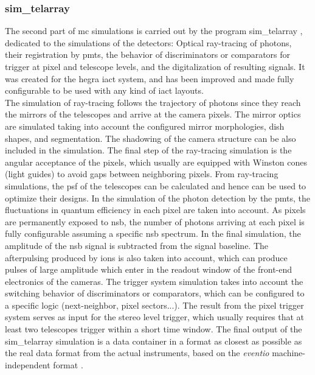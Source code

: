 \documentclass[main.tex]{subfiles}
\begin{document}
\subsubsection{sim\_telarray} \label{sec:simtel}

The second part of \gls{mc} simulations is carried out by the program sim\_telarray \cite{2008corsikanadsimtelarray}, dedicated to the simulations of the detectors: Optical ray-tracing of photons, their registration by \glspl{pmt}, the behavior of discriminators or comparators for trigger at pixel and telescope levels, and the digitalization of resulting signals. It was created for the \gls{hegra} \gls{iact} system, and has been improved and made fully configurable to be used with any kind of \gls{iact} layouts.\\
The simulation of ray-tracing follows the trajectory of photons since they reach the mirrors of the telescopes and arrive at the camera pixels. The mirror optics are simulated taking into account the configured mirror morphologies, dish shapes, and segmentation. The shadowing of the camera structure can be also included in the simulation. The final step of the ray-tracing simulation is the angular acceptance of the pixels, which usually are equipped with Winston cones (light guides) to avoid gaps between neighboring pixels. From ray-tracing simulations, the \gls{psf} of the telescopes can be calculated and hence can be used to optimize their designs. In the simulation of the photon detection by the \glspl{pmt}, the fluctuations in quantum efficiency in each pixel are taken into account.  As pixels are permanently exposed to \gls{nsb}, the number of photons arriving at each pixel is fully configurable assuming a specific \gls{nsb} spectrum. In the final simulation, the amplitude of the \gls{nsb} signal is subtracted from the signal baseline. The afterpulsing produced by ions is also taken into account, which can produce pulses of large amplitude which enter in the readout window of the front-end electronics of the cameras. The trigger system simulation takes into account the switching behavior of discriminators or comparators, which can be configured to a specific logic (next-neighbor, pixel sectors...). The result from the pixel trigger system serves as input for the stereo level trigger, which usually requires that at least two telescopes trigger within a short time window. The final output of the sim\_telarray simulation is a data container in a format as closest as possible as the real data format from the actual instruments, based on the \textit{eventio} machine-independent format \cite{eventio}.
\end{document}
